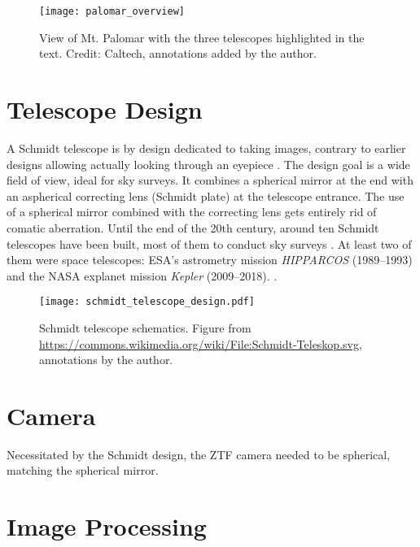 \begin{figure*}[]
    \texttt{[image: palomar\_overview]}
    \caption[View of Mt. Palomar]{View of Mt. Palomar with the three telescopes highlighted in the text. Credit: Caltech, annotations added by the author.}
\end{figure*}

\section{Telescope Design}
A Schmidt telescope is by design dedicated to taking images, contrary to earlier designs allowing actually looking through an eyepiece . The design goal is a wide field of view, ideal for sky surveys. It combines a spherical mirror at the end with an aspherical correcting lens (Schmidt plate) at the telescope entrance. The use of a spherical mirror combined with the correcting lens gets entirely rid of comatic aberration. Until the end of the 20th century, around ten Schmidt telescopes have been built, most of them to conduct sky surveys . At least two of them were space telescopes: ESA's astrometry mission \textit{HIPPARCOS}  (1989--1993) and the NASA explanet mission \textit{Kepler}  (2009--2018). .

\begin{figure}[]
    \texttt{[image: schmidt\_telescope\_design.pdf]}
    \caption[Schmidt telescope schematics]{Schmidt telescope schematics. Figure from \url{https://commons.wikimedia.org/wiki/File:Schmidt-Teleskop.svg}, annotations by the author.}
\end{figure}

\section{Camera}
Necessitated by the Schmidt design, the ZTF camera needed to be spherical, matching the spherical mirror.

\section{Image Processing}